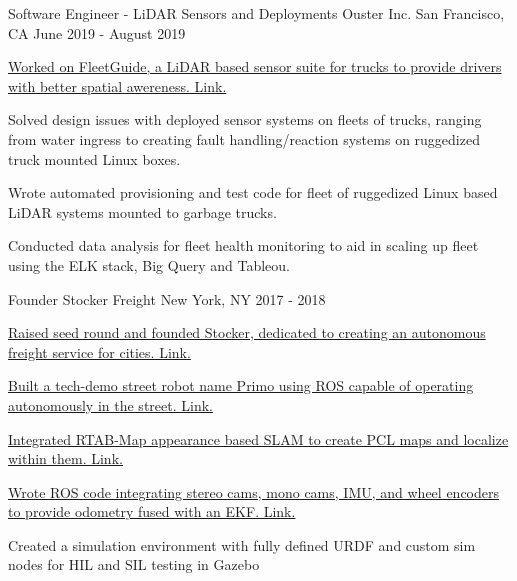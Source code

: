\begin{cventries}
  \cventry
    {Software Engineer - LiDAR Sensors and Deployments} %
    {Ouster Inc.} %
    {San Francisco, CA} %
    {June 2019 - August 2019} %
    {
      \begin{cvitems} %
        \item {\href{https://www.fleetguide.io/}
                {Worked on FleetGuide, a LiDAR based sensor suite for trucks to provide drivers with better spatial awereness. \color{darkblue}Link.}}
        \item {Solved design issues with deployed sensor systems on fleets of trucks, ranging from water ingress to creating fault handling/reaction
        systems on ruggedized truck mounted Linux boxes.}
        \item {Wrote automated provisioning and test code for fleet of ruggedized Linux based LiDAR systems mounted to garbage trucks.}
        \item {Conducted data analysis for fleet health monitoring to aid in scaling up fleet using the ELK stack, Big Query and Tableou.}
      \end{cvitems}
    }

  \cventry
    {Founder} %
    {Stocker Freight} %
    {New York, NY} %
    {2017 - 2018} %
    {
      \begin{cvitems} %
        \item {\href{https://paulsammut.com/lib/exe/fetch.php/seed_deck_r14.pdf}
              {Raised seed round and founded Stocker, dedicated to creating an autonomous freight service for cities. \color{darkblue}Link.}}
        \item {\href{https://paulsammut.com/doku.php/primo_robot}
            {Built a tech-demo street robot name Primo using ROS capable of operating autonomously in the street. \color{darkblue}Link.}}
        \item {\href{https://paulsammut.com/doku.php/stereo_cameras}
            {Integrated RTAB-Map appearance based SLAM to create PCL maps and localize within them. \color{darkblue}Link.}}
        \item {\href{http://bit.ly/2T3d4sU}
            {Wrote ROS code integrating stereo cams, mono cams, IMU, and wheel encoders to provide odometry fused with an EKF. \color{darkblue}Link.}}
        \item {Created a simulation environment with fully defined URDF and custom sim nodes for HIL and SIL testing in Gazebo}
      \end{cvitems}
    }


\end{cventries}
